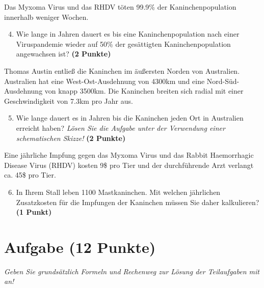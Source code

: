 \documentclass[a4paper, 9pt]{scrartcl}\usepackage[]{graphicx}\usepackage[]{xcolor}
\begin{document}
Das Myxoma Virus und das RHDV töten 99.9\% der Kaninchenpopulation innerhalb weniger Wochen.

\begin{enumerate}
  \setcounter{enumi}{3}  
\item Wie lange in Jahren dauert es bis eine Kaninchenpopulation nach einer Viruspandemie wieder auf 50\% der gesättigten Kaninchenpopulation angewachsen ist?  \textbf{(2 Punkte)}
\end{enumerate}

Thomas Austin entließ die Kaninchen im äußersten Norden von Australien. Australien hat eine West-Ost-Ausdehnung von 4300km und eine Nord-Süd-Ausdehnung von knapp 3500km. Die Kaninchen breiten sich radial mit einer Geschwindigkeit von 7.3km pro Jahr aus.

\begin{enumerate}
  \setcounter{enumi}{4}
\item Wie lange dauert es in Jahren bis die Kaninchen jeden Ort in Australien erreicht haben? \textit{Lösen Sie die Aufgabe unter der Verwendung einer schematischen Skizze!} \textbf{(2 Punkte)}
\end{enumerate}

Eine jährliche Impfung gegen das Myxoma Virus und das Rabbit Haemorrhagic Disease Virus (RHDV) kosten 9\$ pro Tier und der durchführende Arzt verlangt ca. 45\$ pro Tier.

\begin{enumerate}
  \setcounter{enumi}{5}
\item In Ihrem Stall leben 1100 Mastkaninchen. Mit welchen jährlichen Zusatzkosten für die Impfungen der Kaninchen müssen Sie daher kalkulieren? \textbf{(1 Punkt)}
\end{enumerate}
 
\clearpage

\section{Aufgabe \hfill (12 Punkte)}

\textit{Geben Sie grundsätzlich Formeln und Rechenweg zur Lösung der Teilaufgaben mit an!} \\[1Ex]
 
\end{document}

